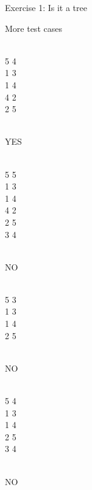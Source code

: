 \documentclass{beamer}
\begin{document}
\begin{frame}{Exercise 1: Is it a tree}

  \begin{exampleblock}{More test cases}
    \begin{minipage}[t]{0.225\linewidth}
    \\5 4\\1 3\\1 4\\4 2\\2 5
    
    \medskip
    \\YES
    \end{minipage}
    \begin{minipage}[t]{0.225\linewidth}
    \\5 5\\1 3\\1 4\\4 2\\2 5\\3 4
    
    \medskip
    \\NO
    \end{minipage}
    \begin{minipage}[t]{0.225\linewidth}
    \\5 3\\1 3\\1 4\\2 5
    
    \medskip
    \\NO
    \end{minipage}
    \begin{minipage}[t]{0.225\linewidth}
    \\5 4\\1 3\\1 4\\2 5\\3 4
    
    \medskip
    \\NO
    \end{minipage}
  \end{exampleblock}
\end{frame}
\end{document}
